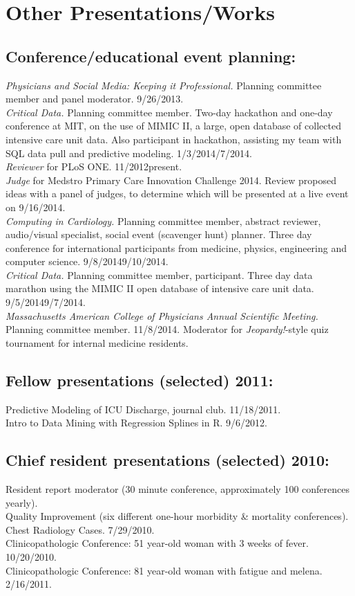 \documentclass[12pt]{article}
\begin{document}
\section*{Other Presentations/Works}

\subsection*{Conference/educational event planning:}
\emph{Physicians and Social Media: Keeping it Professional.} Planning
committee member and panel moderator. 9/26/2013.\\
\emph{Critical Data.} Planning committee member. Two-day hackathon and
one-day conference at MIT, on the use of MIMIC II, a large, open
database of collected intensive care unit data. Also participant in
hackathon, assisting my team with SQL data pull and predictive
modeling. 1/3/2014\ndash{}/7/2014.\\
\emph{Reviewer} for PLoS ONE. 11/2012\ndash{}present.\\
\emph{Judge} for Medstro Primary Care Innovation Challenge 2014.
Review proposed ideas with a panel of judges, to determine which will
be presented at a live event on 9/16/2014.\\
\emph{Computing in Cardiology.} Planning committee member, abstract
reviewer, audio/visual specialist, social event (scavenger hunt)
planner. Three day conference for international participants from
medicine, physics, engineering and computer science.
9/8/2014\ndash{}9/10/2014.\\
\emph{Critical Data.} Planning committee member, participant. Three
day data marathon using the MIMIC II open database of intensive care
unit data. 9/5/2014\ndash{}9/7/2014.\\
\emph{Massachusetts American College of Physicians Annual Scientific
  Meeting.} Planning committee member. 11/8/2014. Moderator for
\emph{Jeopardy!}-style quiz tournament for internal medicine
residents.

\subsection*{Fellow presentations (selected) 2011:}
Predictive Modeling of ICU Discharge, journal club. 11/18/2011.\\
Intro to Data Mining with Regression Splines in R. 9/6/2012.

\subsection*{Chief resident presentations (selected) 2010:}
Resident report moderator (30 minute conference, approximately 100
conferences yearly).\\
Quality Improvement (six different one-hour morbidity \& mortality
conferences).\\
Chest Radiology Cases. 7/29/2010.\\
Clinicopathologic Conference: 51 year-old woman with 3 weeks of fever.
10/20/2010.\\
Clinicopathologic Conference: 81 year-old woman with fatigue and
melena. 2/16/2011.
\end{document}
